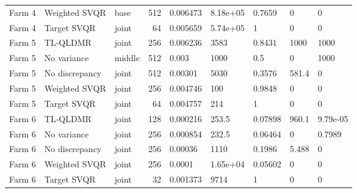 \begin{table}[pos=t,width=\FullWidth]
\begin{tabular}{lllrlllll}
Farm 4 & Weighted SVQR & base & 512 & 0.006473 & 8.18e+05 & 0.7659 & 0 & 0 \\
Farm 4 & Target SVQR & joint & 64 & 0.005659 & 5.74e+05 & 1 & 0 & 0 \\
Farm 5 & TL-QLDMR & joint & 256 & 0.006236 & 3583 & 0.8431 & 1000 & 1000 \\
Farm 5 & No variance & middle & 512 & 0.003 & 1000 & 0.5 & 0 & 1000 \\
Farm 5 & No discrepancy & joint & 512 & 0.00301 & 5030 & 0.3576 & 581.4 & 0 \\
Farm 5 & Weighted SVQR & joint & 256 & 0.004746 & 100 & 0.9848 & 0 & 0 \\
Farm 5 & Target SVQR & joint & 64 & 0.004757 & 214 & 1 & 0 & 0 \\
Farm 6 & TL-QLDMR & joint & 128 & 0.000216 & 253.5 & 0.07898 & 960.1 & 9.79e-05 \\
Farm 6 & No variance & joint & 256 & 0.000854 & 232.5 & 0.06464 & 0 & 0.7989 \\
Farm 6 & No discrepancy & joint & 256 & 0.00036 & 1110 & 0.1986 & 5.488 & 0 \\
Farm 6 & Weighted SVQR & joint & 256 & 0.0001 & 1.65e+04 & 0.05602 & 0 & 0 \\
Farm 6 & Target SVQR & joint & 32 & 0.001373 & 9714 & 1 & 0 & 0 \\
\bottomrule
\end{tabular}
\end{table}

